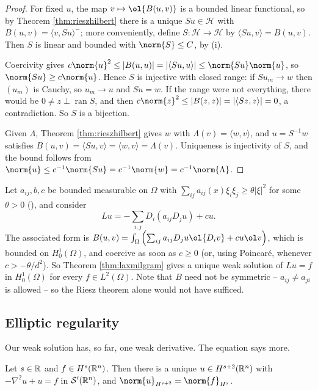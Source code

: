 \documentclass[a4paper]{scrartcl}
\newcommand{\ip}[2]{\langle #1, #2 \rangle}
\newcommand{\Sch}{\mathcal{S}}
\newcommand{\Hil}{\mathcal{H}}
\begin{document}
\begin{proof}
	For fixed $u$, the map $v \mapsto \ol{B(u,v)}$ is a bounded linear functional, so by Theorem \ref{thm:rieszhilbert} there is a unique $Su \in \Hil$ with $B(u,v)=\ip{v}{Su}^-$; more conveniently, define $S : \Hil \to \Hil$ by $\ip{Su}{v}=B(u,v)$. Then $S$ is linear and bounded with $\norm{S}\le C$, by (i).

	Coercivity gives $c\norm{u}^2\le|B(u,u)|=|\ip{Su}{u}|\le\norm{Su}\norm{u}$, so $\norm{Su}\ge c\norm{u}$. Hence $S$ is injective with closed range: if $Su_m \to w$ then $(u_m)$ is Cauchy, so $u_m \to u$ and $Su = w$. If the range were not everything, there would be $0 \ne z \perp \operatorname{ran}S$, and then $c\norm{z}^2\le|B(z,z)|=|\ip{Sz}{z}|=0$, a contradiction. So $S$ is a bijection.

	Given $\Lambda$, Theorem \ref{thm:rieszhilbert} gives $w$ with $\Lambda(v)=\ip{w}{v}$, and $u = S^{-1}w$ satisfies $B(u,v)=\ip{Su}{v}=\ip{w}{v}=\Lambda(v)$. Uniqueness is injectivity of $S$, and the bound follows from $\norm{u}\le c^{-1}\norm{Su}=c^{-1}\norm{w}=c^{-1}\norm{\Lambda}$.
\end{proof}

\begin{example}
	Let $a_{ij},b,c$ be bounded measurable on $\Omega$ with $\sum_{ij}a_{ij}(x)\xi_i\xi_j\ge\theta|\xi|^2$ for some $\theta>0$ (), and consider
	$$Lu = -\sum_{i,j}D_i(a_{ij}D_ju)+cu.$$
	The associated form is $B(u,v)=\int_\Omega\left(\sum_{ij}a_{ij}D_ju\ol{D_iv}+cu\ol v\right)$, which is bounded on $H_0^1(\Omega)$, and coercive as soon as $c \ge 0$ (or, using Poincar\'e, whenever $c > -\theta/d^2$). So Theorem \ref{thm:laxmilgram} gives a unique weak solution of $Lu = f$ in $H_0^1(\Omega)$ for every $f \in L^2(\Omega)$. Note that $B$ need not be symmetric -- $a_{ij}\ne a_{ji}$ is allowed -- so the Riesz theorem alone would not have sufficed.
\end{example}

\subsection{Elliptic regularity}

Our weak solution has, so far, one weak derivative. The equation says more.

\begin{proposition}\label{prop:regularityRn}
	Let $s \in \mathbb{R}$ and $f \in H^s(\mathbb{R}^n)$. Then there is a unique $u \in H^{s+2}(\mathbb{R}^n)$ with $-\nabla^2u+u=f$ in $\Sch'(\R^n)$, and $\norm{u}_{H^{s+2}}=\norm{f}_{H^s}$.
\end{proposition}
\end{document}
